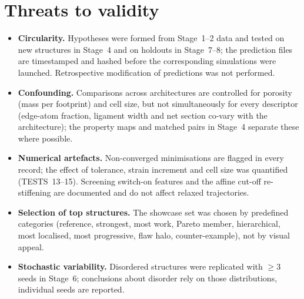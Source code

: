 \section{Threats to validity}
\begin{itemize}
\item \textbf{Circularity.} Hypotheses were formed from Stage~1--2 data and tested on new structures in Stage~4 and on holdouts in Stage~7--8; the prediction files are timestamped and hashed before the corresponding simulations were launched. Retrospective modification of predictions was not performed.
\item \textbf{Confounding.} Comparisons across architectures are controlled for porosity (mass per footprint) and cell size, but not simultaneously for every descriptor (edge-atom fraction, ligament width and net section co-vary with the architecture); the property maps and matched pairs in Stage~4 separate these where possible.
\item \textbf{Numerical artefacts.} Non-converged minimisations are flagged in every record; the effect of tolerance, strain increment and cell size was quantified (TESTS~13--15). Screening switch-on features and the affine cut-off re-stiffening are documented and do not affect relaxed trajectories.
\item \textbf{Selection of top structures.} The showcase set was chosen by predefined categories (reference, strongest, most work, Pareto member, hierarchical, most localised, most progressive, flaw halo, counter-example), not by visual appeal.
\item \textbf{Stochastic variability.} Disordered structures were replicated with $\ge3$ seeds in Stage~6; conclusions about disorder rely on those distributions, individual seeds are reported.
\end{itemize}

